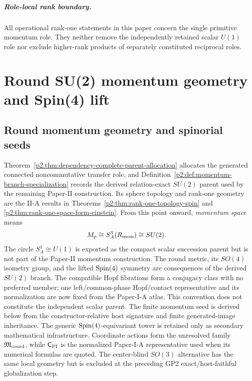 \documentclass[12pt,a4paper]{article}
\begin{document}
\subparagraph{Role-local rank boundary.}
All operational rank-one statements in this paper concern the single primitive
momentum role.  They neither remove the independently retained scalar
\(U(1)\) role nor exclude higher-rank products of separately constituted
reciprocal roles.

\section{Round SU(2) momentum geometry and Spin(4) lift}
\label{paper2b:sec:organized-round}

\subsection{Round momentum geometry and spinorial seeds}
\label{p2:sec:classical-momentum-geometry-operation-first}

Theorem~\ref{p2:thm:dependency-complete-parent-allocation} allocates the
generated connected noncommutative transfer role, and
Definition~\ref{p2:def:momentum-branch-specialization} records the derived
relation-exact \(SU(2)\) parent used by the remaining Paper-II
construction.  Its sphere topology and rank-one geometry are the II-A results
in Theorems~\ref{p2:thm:rank-one-topology-spin} and
\ref{p2:thm:rank-one-space-form-einstein}.  From
this point onward, \emph{momentum space} means
\[
        M_p\cong S^3_A(R_{\mathrm{mom}})\cong SU(2).
\]
The circle \(S^1_A\cong U(1)\) is exported as the compact scalar succession
parent but is not part of the Paper-II momentum construction.  The round
metric, its \(SO(4)\) isometry group, and the lifted \(\mathrm{Spin}(4)\) symmetry are
consequences of the derived \(SU(2)\) branch.
The compatible Hopf fibrations form a conjugacy class with no preferred
member; one left/common-phase Hopf/contact representative and its normalization
are now fixed from the Paper-I-A atlas.  This convention does not constitute the
independent scalar parent.  The finite momentum seed is derived below from the constructor-relative host
signature and finite generated-image inheritance.  The generic \(\mathrm{Spin}(4)\)-equivariant
tower is retained only as secondary mathematical infrastructure.  Coordinate
actions form the unresolved family \(\mathfrak M_{\rm coord}\), while
\(\mathsf C_{\rm PI}\) is the normalized Paper-I-A representative used when
its numerical formulas are quoted.
The center-blind \(SO(3)\) alternative has the same local geometry but is excluded
at the preceding GP2 exact/host-faithful globalization step.
\end{document}
